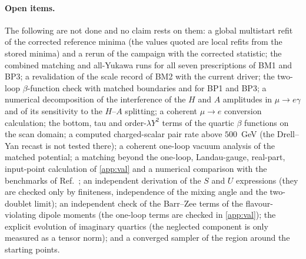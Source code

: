 \documentclass[twocolumn,epjc3]{svjour3}
\begin{document}
\paragraph{Open items.} The following are not done and no claim rests on them: a global multistart refit of the corrected reference minima (the values quoted are local refits from the stored minima) and a rerun of the campaign with the corrected statistic; the combined matching and all-Yukawa runs for all seven prescriptions of BM1 and BP3; a revalidation of the scale record of BM2 with the current driver; the two-loop $\beta$-function check with matched boundaries and for BP1 and BP3; a numerical decomposition of the interference of the $H$ and $A$ amplitudes in $\mu\to e\gamma$ and of its sensitivity to the $H$--$A$ splitting; a coherent $\mu\to e$ conversion calculation; the bottom, tau and order-$\lambda Y^2$ terms of the quartic $\beta$ functions on the scan domain; a computed charged-scalar pair rate above $500$~GeV (the Drell--Yan recast is not tested there); a coherent one-loop vacuum analysis of the matched potential; a matching beyond the one-loop, Landau-gauge, real-part, input-point calculation of \ref{app:val} and a numerical comparison with the benchmarks of Ref.~\cite{Schmidt:2025run}; an independent derivation of the $S$ and $U$ expressions (they are checked only by finiteness, independence of the mixing angle and the two-doublet limit); an independent check of the Barr--Zee terms of the flavour-violating dipole moments (the one-loop terms are checked in \ref{app:val}); the explicit evolution of imaginary quartics (the neglected component is only measured as a tensor norm); and a converged sampler of the region around the starting points.
\end{document}
